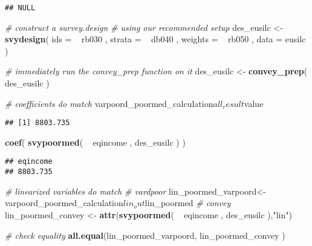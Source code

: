 \documentclass[]{book}
\newenvironment{Shaded}{\begin{snugshade}}{\end{snugshade}}
\newcommand{\KeywordTok}[1]{\textcolor[rgb]{0.13,0.29,0.53}{\textbf{{#1}}}}
\newcommand{\DataTypeTok}[1]{\textcolor[rgb]{0.13,0.29,0.53}{{#1}}}
\newcommand{\StringTok}[1]{\textcolor[rgb]{0.31,0.60,0.02}{{#1}}}
\newcommand{\CommentTok}[1]{\textcolor[rgb]{0.56,0.35,0.01}{\textit{{#1}}}}
\newcommand{\NormalTok}[1]{{#1}}
\theoremstyle{definition}
\theoremstyle{definition}
\theoremstyle{remark}
\begin{document}
\begin{verbatim}
## NULL
\end{verbatim}

\begin{Shaded}
\begin{Highlighting}[]
\CommentTok{# construct a survey.design}
\CommentTok{# using our recommended setup}
\NormalTok{des_eusilc <-}\StringTok{ }
\StringTok{    }\KeywordTok{svydesign}\NormalTok{( }
        \DataTypeTok{ids =} \NormalTok{~}\StringTok{ }\NormalTok{rb030 , }
        \DataTypeTok{strata =} \NormalTok{~}\StringTok{ }\NormalTok{db040 ,  }
        \DataTypeTok{weights =} \NormalTok{~}\StringTok{ }\NormalTok{rb050 , }
        \DataTypeTok{data =} \NormalTok{eusilc}
    \NormalTok{)}

\CommentTok{# immediately run the convey_prep function on it}
\NormalTok{des_eusilc <-}\StringTok{ }\KeywordTok{convey_prep}\NormalTok{( des_eusilc )}

\CommentTok{# coefficients do match}
\NormalTok{varpoord_poormed_calculation$all_result$value}
\end{Highlighting}
\end{Shaded}

\begin{verbatim}
## [1] 8803.735
\end{verbatim}

\begin{Shaded}
\begin{Highlighting}[]
\KeywordTok{coef}\NormalTok{( }\KeywordTok{svypoormed}\NormalTok{( ~}\StringTok{ }\NormalTok{eqincome , des_eusilc ) )}
\end{Highlighting}
\end{Shaded}

\begin{verbatim}
## eqincome 
## 8803.735
\end{verbatim}

\begin{Shaded}
\begin{Highlighting}[]
\CommentTok{# linearized variables do match}
\CommentTok{# vardpoor}
\NormalTok{lin_poormed_varpoord<-}\StringTok{ }\NormalTok{varpoord_poormed_calculation$lin_out$lin_poormed}
\CommentTok{# convey }
\NormalTok{lin_poormed_convey <-}\StringTok{ }\KeywordTok{attr}\NormalTok{(}\KeywordTok{svypoormed}\NormalTok{( ~}\StringTok{ }\NormalTok{eqincome , des_eusilc ),}\StringTok{"lin"}\NormalTok{)}

\CommentTok{# check equality}
\KeywordTok{all.equal}\NormalTok{(lin_poormed_varpoord, lin_poormed_convey )}
\end{Highlighting}
\end{Shaded}
\end{document}
